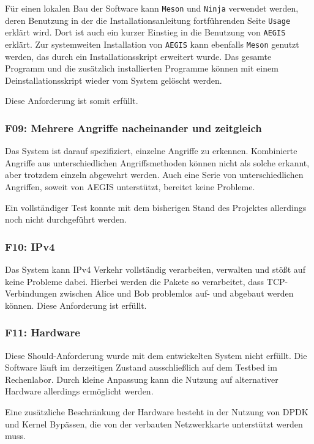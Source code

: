 \documentclass[../review_3.tex]{subfiles}
\begin{document}
Für einen lokalen Bau der Software kann \texttt{Meson} und \texttt{Ninja} verwendet werden, deren Benutzung in der die Installationsanleitung fortführenden Seite \texttt{Usage} erklärt wird. Dort ist auch ein kurzer Einstieg in die Benutzung von \texttt{AEGIS} erklärt.  
Zur systemweiten Installation von \texttt{AEGIS} kann ebenfalls \texttt{Meson} genutzt werden, das durch ein Installationsskript erweitert wurde.
Das gesamte Programm und die zusätzlich installierten Programme können mit einem Deinstallationsskript wieder vom System gelöscht werden.

Diese Anforderung ist somit erfüllt.

\subsubsection{F09: Mehrere Angriffe nacheinander und zeitgleich}
Das System ist darauf spezifiziert, einzelne Angriffe zu erkennen. Kombinierte Angriffe aus unterschiedlichen Angriffsmethoden können nicht als solche erkannt, aber trotzdem einzeln abgewehrt werden. Auch eine Serie von unterschiedlichen Angriffen, soweit von AEGIS unterstützt, bereitet keine Probleme. 

Ein vollständiger Test konnte mit dem bisherigen Stand des Projektes allerdings noch nicht durchgeführt werden.

\subsubsection{F10: IPv4}
Das System kann IPv4 Verkehr vollständig verarbeiten, verwalten und stößt auf keine Probleme dabei. Hierbei werden die Pakete so verarbeitet, dass TCP-Verbindungen zwischen Alice und Bob problemlos auf- und abgebaut werden können. Diese Anforderung ist erfüllt.

\subsubsection{F11: Hardware}
Diese Should-Anforderung wurde mit dem entwickelten System nicht erfüllt. Die Software läuft im derzeitigen Zustand ausschließlich auf dem Testbed im Rechenlabor. Durch kleine Anpassung kann die Nutzung auf alternativer Hardware allerdings ermöglicht werden.

Eine zusätzliche Beschränkung der Hardware besteht in der Nutzung von DPDK und Kernel Bypässen, die von der verbauten Netzwerkkarte unterstützt werden muss.
\end{document}
